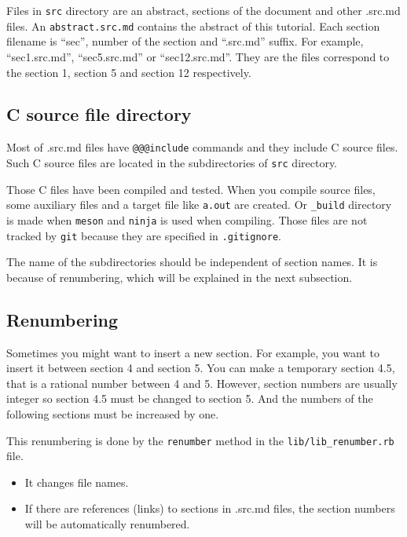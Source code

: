 Files in \texttt{src} directory are an abstract, sections of the
document and other .src.md files. An \texttt{abstract.src.md} contains
the abstract of this tutorial. Each section filename is ``sec'', number
of the section and ``.src.md'' suffix. For example, ``sec1.src.md'',
``sec5.src.md'' or ``sec12.src.md''. They are the files correspond to
the section 1, section 5 and section 12 respectively.

\hypertarget{c-source-file-directory}{%
\subsection{C source file directory}\label{c-source-file-directory}}

Most of .src.md files have \texttt{@@@include} commands and they include
C source files. Such C source files are located in the subdirectories of
\texttt{src} directory.

Those C files have been compiled and tested. When you compile source
files, some auxiliary files and a target file like \texttt{a.out} are
created. Or \texttt{\_build} directory is made when \texttt{meson} and
\texttt{ninja} is used when compiling. Those files are not tracked by
\texttt{git} because they are specified in \texttt{.gitignore}.

The name of the subdirectories should be independent of section names.
It is because of renumbering, which will be explained in the next
subsection.

\hypertarget{renumbering}{%
\subsection{Renumbering}\label{renumbering}}

Sometimes you might want to insert a new section. For example, you want
to insert it between section 4 and section 5. You can make a temporary
section 4.5, that is a rational number between 4 and 5. However, section
numbers are usually integer so section 4.5 must be changed to section 5.
And the numbers of the following sections must be increased by one.

This renumbering is done by the \texttt{renumber} method in the
\texttt{lib/lib\_renumber.rb} file.

\begin{itemize}
\tightlist
\item
  It changes file names.
\item
  If there are references (links) to sections in .src.md files, the
  section numbers will be automatically renumbered.
\end{itemize}

